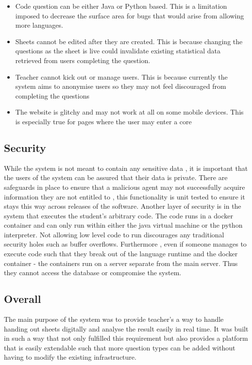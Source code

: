 \documentclass[12pt]{article}
\begin{document}
\begin{itemize}
	\item Code question can be either Java or Python based. This is a limitation imposed to decrease the surface area for bugs that would arise from allowing more languages.
	\item Sheets cannot be edited after they are created. This is because changing the questions as the sheet is live could invalidate existing statistical data retrieved from users completing the question.
	\item Teacher cannot kick out or manage users. This is because currently the system aims to anonymise users so they may not feel discouraged from completing the questions
	\item The website is glitchy and may not work at all on some mobile devices. This is especially true for pages where the user may enter a core
\end{itemize}

\subsection{Security}
While the system is not meant to contain any sensitive data , it is important that the users of the system can be assured that their data is private. 
There are safeguards in place to ensure that a malicious agent may not successfully acquire information they are not entitled to , this functionality is unit tested to ensure it stays this way across releases of the software.
Another layer of security is in the system that executes the student's arbitrary code.
The code runs in a docker container and can only run within either the java virtual machine or the python interpreter. Not allowing low level code to run discourages any traditional security holes such as buffer overflows.
Furthermore , even if someone manages to execute code such that they break out of the language runtime and the docker container - the containers run on a server separate from the main server. Thus they cannot access the database or compromise the system.

\subsection{Overall}
The main purpose of the system was to provide teacher's a way to handle handing out sheets digitally and analyse the result easily in real time. It was built in such a way that not only fulfilled this requirement but also provides a platform that is easily extendable such that more question types can be added without having to modify the existing infrastructure.
\end{document}
